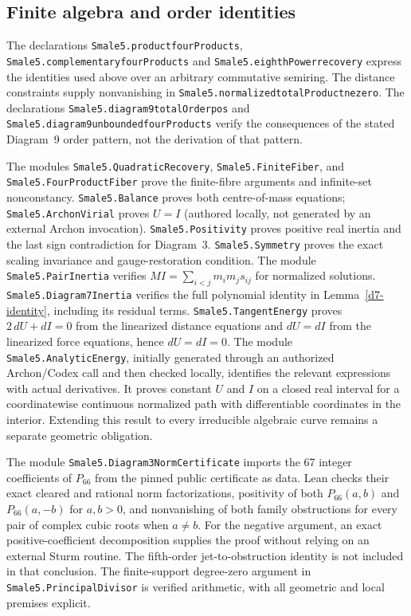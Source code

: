 \documentclass[Threeside,11pt]{article}
\theoremstyle{definition}
\theoremstyle{remark}
\numberwithin{equation}{section}
\theoremstyle{remark}
\newcommand{\code}[1]{\begingroup\def\_{\textunderscore\allowbreak}\texttt{#1}\endgroup}
\begin{document}
\subsection{Finite algebra and order identities}
The declarations \code{Smale5.product\_fourProducts},
\code{Smale5.complementary\_fourProducts} and
\code{Smale5.eighthPower\_recovery} express the identities used above over an
arbitrary commutative semiring. The distance constraints supply nonvanishing
in \code{Smale5.normalized\_totalProduct\_ne\_zero}.
The declarations \code{Smale5.diagram9\_totalOrder\_pos} and
\code{Smale5.diagram9\_unbounded\_fourProducts} verify the consequences of
the stated Diagram~9 order pattern, not the derivation of that pattern.

The modules \code{Smale5.QuadraticRecovery}, \code{Smale5.FiniteFiber}, and
\code{Smale5.FourProductFiber} prove the finite-fibre arguments and infinite-set
nonconstancy. \code{Smale5.Balance} proves both centre-of-mass equations;
\code{Smale5.ArchonVirial} proves $U=I$ (authored locally, not generated by an
external Archon invocation). \code{Smale5.Positivity} proves positive real
inertia and the last sign contradiction for Diagram~3. \code{Smale5.Symmetry}
proves the exact scaling invariance and gauge-restoration condition.
The module \code{Smale5.PairInertia} verifies $MI=\sum_{i<j}m_im_js_{ij}$
for normalized solutions. \code{Smale5.Diagram7Inertia} verifies the full
polynomial identity in Lemma~\ref{d7-identity}, including its residual terms.
\code{Smale5.TangentEnergy} proves $2\,dU+dI=0$ from the linearized distance
equations and $dU=dI$ from the linearized force equations, hence $dU=dI=0$.
The module \code{Smale5.AnalyticEnergy}, initially generated through an
authorized Archon/Codex call and then checked locally, identifies the relevant
expressions with actual derivatives. It proves constant $U$ and $I$ on a
closed real interval for a coordinatewise continuous normalized path with
differentiable coordinates in the interior. Extending this result to every
irreducible algebraic curve remains a separate geometric obligation.

The module \code{Smale5.Diagram3NormCertificate} imports the 67 integer
coefficients of $P_{66}$ from the pinned public certificate as data. Lean
checks their exact cleared and rational norm factorizations, positivity of
both $P_{66}(a,b)$ and $P_{66}(a,-b)$ for $a,b>0$, and nonvanishing of both
family obstructions for every pair of complex cubic roots when $a\ne b$.
For the negative argument, an exact positive-coefficient decomposition supplies
the proof without relying on an external Sturm routine. The fifth-order
jet-to-obstruction identity is not included in that conclusion.
The finite-support degree-zero argument in \code{Smale5.PrincipalDivisor}
is verified arithmetic, with all geometric and local premises explicit.
\end{document}
